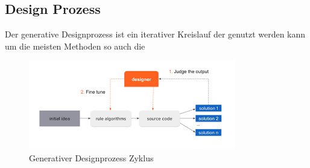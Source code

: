 \subsection*{Design Prozess}


Der generative Designprozess ist ein iterativer Kreislauf der genutzt werden kann um die meisten Methoden so auch die \autocite{12}


\begin{figure}[h]
    \centering
    \begin{minipage}{0.5\textwidth}
      \centering
      \includegraphics[width=\textwidth]{./images/designprozess.png}
    \end{minipage}
    \caption{Generativer Designprozess Zyklus}
    \label{fig:meinbild}
  \end{figure}
